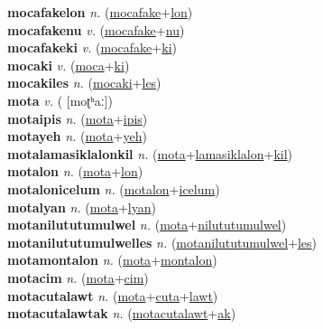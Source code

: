 \textbf{mocafakelon} \textit{n.} (\hyperref[mocafake]{mocafake}+\hyperref[lon]{lon})
 \label{mocafakelon} \\
\textbf{mocafakenu} \textit{v.} (\hyperref[mocafake]{mocafake}+\hyperref[nu]{nu})
 \label{mocafakenu} \\
\textbf{mocafakeki} \textit{v.} (\hyperref[mocafake]{mocafake}+\hyperref[ki]{ki})
 \label{mocafakeki} \\
\textbf{mocaki} \textit{v.} (\hyperref[moca]{moca}+\hyperref[ki]{ki})
 \label{mocaki} \\
\textbf{mocakiles} \textit{n.} (\hyperref[mocaki]{mocaki}+\hyperref[les]{les})
 \label{mocakiles} \\
\textbf{mota} \textit{v.} ( [moʈʰaː])
 \label{mota} \\
\textbf{motaipis} \textit{n.} (\hyperref[mota]{mota}+\hyperref[ipis]{ipis})
 \label{motaipis} \\
\textbf{motayeh} \textit{n.} (\hyperref[mota]{mota}+\hyperref[yeh]{yeh})
 \label{motayeh} \\
\textbf{motalamasiklalonkil} \textit{n.} (\hyperref[mota]{mota}+\hyperref[lamasiklalon]{lamasiklalon}+\hyperref[kil]{kil})
 \label{motalamasiklalonkil} \\
\textbf{motalon} \textit{n.} (\hyperref[mota]{mota}+\hyperref[lon]{lon})
 \label{motalon} \\
\textbf{motalonicelum} \textit{n.} (\hyperref[motalon]{motalon}+\hyperref[icelum]{icelum})
 \label{motalonicelum} \\
\textbf{motalyan} \textit{n.} (\hyperref[mota]{mota}+\hyperref[lyan]{lyan})
 \label{motalyan} \\
\textbf{motanilututumulwel} \textit{n.} (\hyperref[mota]{mota}+\hyperref[nilututumulwel]{nilututumulwel})
 \label{motanilututumulwel} \\
\textbf{motanilututumulwelles} \textit{n.} (\hyperref[motanilututumulwel]{motanilututumulwel}+\hyperref[les]{les})
 \label{motanilututumulwelles} \\
\textbf{motamontalon} \textit{n.} (\hyperref[mota]{mota}+\hyperref[montalon]{montalon})
 \label{motamontalon} \\
\textbf{motacim} \textit{n.} (\hyperref[mota]{mota}+\hyperref[cim]{cim})
 \label{motacim} \\
\textbf{motacutalawt} \textit{n.} (\hyperref[mota]{mota}+\hyperref[cuta]{cuta}+\hyperref[lawt]{lawt})
 \label{motacutalawt} \\
\textbf{motacutalawtak} \textit{n.} (\hyperref[motacutalawt]{motacutalawt}+\hyperref[ak]{ak})
